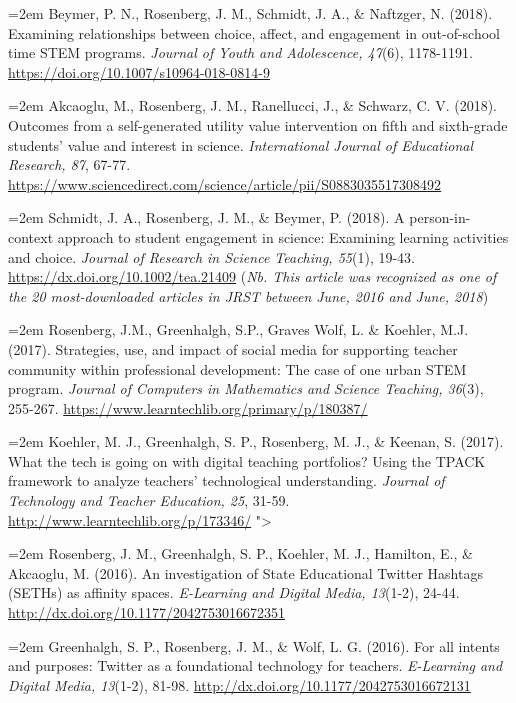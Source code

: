 \documentclass[
  14,
]{article}
\begin{document}
\hangindent=2em Beymer, P. N., Rosenberg, J. M., Schmidt, J. A., \&
Naftzger, N. (2018). Examining relationships between choice, affect, and
engagement in out-of-school time STEM programs. \emph{Journal of Youth
and Adolescence, 47}(6), 1178-1191.
\url{https://doi.org/10.1007/s10964-018-0814-9}

\hangindent=2em Akcaoglu, M., Rosenberg, J. M., Ranellucci, J., \&
Schwarz, C. V. (2018). Outcomes from a self-generated utility value
intervention on fifth and sixth-grade students' value and interest in
science. \emph{International Journal of Educational Research, 87},
67-77.
\url{https://www.sciencedirect.com/science/article/pii/S0883035517308492}

\hangindent=2em Schmidt, J. A., Rosenberg, J. M., \& Beymer, P. (2018).
A person-in-context approach to student engagement in science: Examining
learning activities and choice. \emph{Journal of Research in Science
Teaching, 55}(1), 19-43. \url{https://dx.doi.org/10.1002/tea.21409}
(\emph{Nb. This article was recognized as one of the 20 most-downloaded
articles in JRST between June, 2016 and June, 2018})

\hangindent=2em Rosenberg, J.M., Greenhalgh, S.P., Graves Wolf, L. \&
Koehler, M.J. (2017). Strategies, use, and impact of social media for
supporting teacher community within professional development: The case
of one urban STEM program. \emph{Journal of Computers in Mathematics and
Science Teaching, 36}(3), 255-267.
\url{https://www.learntechlib.org/primary/p/180387/}

\hangindent=2em Koehler, M. J., Greenhalgh, S. P., Rosenberg, M. J., \&
Keenan, S. (2017). What the tech is going on with digital teaching
portfolios? Using the TPACK framework to analyze teachers' technological
understanding. \emph{Journal of Technology and Teacher Education, 25},
31-59. \url{http://www.learntechlib.org/p/173346/} "\textgreater{}

\hangindent=2em Rosenberg, J. M., Greenhalgh, S. P., Koehler, M. J.,
Hamilton, E., \& Akcaoglu, M. (2016). An investigation of State
Educational Twitter Hashtags (SETHs) as affinity spaces.
\emph{E-Learning and Digital Media, 13}(1-2), 24-44.
\url{http://dx.doi.org/10.1177/2042753016672351}

\hangindent=2em Greenhalgh, S. P., Rosenberg, J. M., \& Wolf, L. G.
(2016). For all intents and purposes: Twitter as a foundational
technology for teachers. \emph{E-Learning and Digital Media, 13}(1-2),
81-98. \url{http://dx.doi.org/10.1177/2042753016672131}
\end{document}
